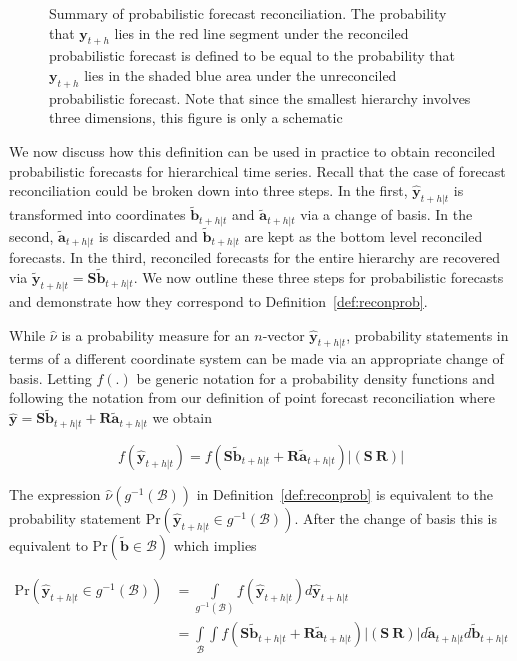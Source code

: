 \documentclass[a4paper, 11pt]{article}
\theoremstyle{theo}
\theoremstyle{definition}
\begin{document}
\begin{figure}
	
	\caption{Summary of probabilistic forecast reconciliation.  The probability that ${\bm y}_{t+h}$ lies in the red line segment under the reconciled probabilistic forecast is defined to be equal to the probability that ${\bm y}_{t+h}$ lies in the shaded blue area under the unreconciled probabilistic forecast.  Note that since the smallest hierarchy involves three dimensions, this figure is only a schematic}\label{fig:pfr_sch} 
\end{figure}

We now discuss how this definition can be used in practice to obtain reconciled probabilistic forecasts for hierarchical time series.   Recall that the case of forecast reconciliation could be broken down into three steps.  In the first, $\hat{\bm{y}}_{t+h|t}$ is transformed into coordinates $\tilde{\bm{b}}_{t+h|t}$ and $\tilde{\bm{a}}_{t+h|t}$ via a change of basis.  In the second, $\tilde{\bm{a}}_{t+h|t}$ is discarded and $\tilde{\bm{b}}_{t+h|t}$ are kept as the bottom level reconciled forecasts.  In the third, reconciled forecasts for the entire hierarchy are recovered via $\tilde{\bm{y}}_{t+h|t}=\bm{S}\tilde{\bm{b}}_{t+h|t}$.  We now outline these three steps for probabilistic forecasts and demonstrate how they correspond to Definition~\ref{def:reconprob}.

While $\hat{\nu}$ is a probability measure for an $n$-vector $\hat{\bm{y}}_{t+h|t}$,  probability statements in terms of a different coordinate system can be made via an appropriate change of basis. Letting $f(.)$ be generic notation for a probability density functions and following the notation from our definition of point forecast reconciliation where $\hat{\bm{y}}=\bm{S}\tilde{\bm{b}}_{t+h|t}+\bm{R}\tilde{\bm{a}}_{t+h|t}$ we obtain

\begin{equation}
f(\hat{\bm{y}}_{t+h|t})=f(\bm{S}\tilde{\bm{b}}_{t+h|t}+\bm{R}\tilde{\bm{a}}_{t+h|t})|\left(\bm{S}~\bm{R}\right)|
\end{equation}

The expression $\hat{\nu}(g^{-1}(\mathcal{B}))$ in Definition~\ref{def:reconprob} is equivalent to the probability statement $\mbox{Pr}(\hat{\bm{y}}_{t+h|t}\in g^{-1}(\mathcal{B}))$.  After the change of basis this is equivalent to $\mbox{Pr}(\tilde{\bm{b}}\in \mathcal{B})$ which implies

\begin{align}
\mbox{Pr}(\hat{\bm{y}}_{t+h|t}\in g^{-1}(\mathcal{B}))&=\int\limits_{g^{-1}(\mathcal{B})}f(\hat{\bm{y}}_{t+h|t})d\hat{\bm{y}}_{t+h|t}\\
&=\int\limits_{\mathcal{B}}\int f(\bm{S}\tilde{\bm{b}}_{t+h|t}+\bm{R}\tilde{\bm{a}}_{t+h|t})|\left(\bm{S}~\bm{R}\right)|d\tilde{\bm{a}}_{t+h|t}d\tilde{\bm{b}}_{t+h|t}
\end{align}
\end{document}
